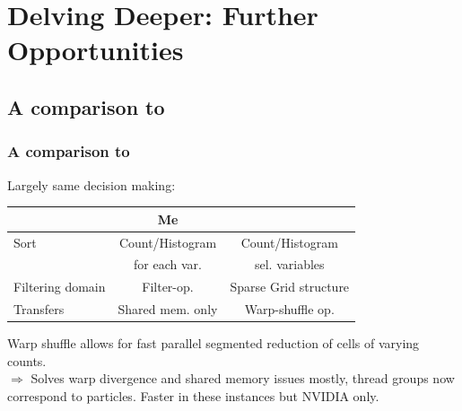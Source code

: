\documentclass{beamer}
\let\oldcite=\cite
\renewcommand{\cite}[1]{\textcolor[rgb]{.55,.55,.89}{\oldcite{#1}}}
\begin{document}
\section{Delving Deeper: Further Opportunities}
\subsection{A comparison to \cite{Gao:2018}}
\begin{frame}
  \frametitle{A comparison to \cite{Gao:2018}}

Largely same decision making:\\
\begin{table}
  \begin{tabular}{|l|c|c|}
    \hline
           & Me              & \cite{Gao:2018} \\\hline
    Sort   & Count/Histogram & Count/Histogram \\
	   & for each var.   & sel. variables  \\\hline
    Filtering domain& Filter-op.& Sparse Grid structure \\\hline
    Transfers        & Shared mem. only & Warp-shuffle op.\\\hline
  \end{tabular}
\end{table}
Warp shuffle allows for fast parallel segmented reduction of cells of varying counts.\\
$\Rightarrow$ Solves warp divergence and shared memory issues mostly, thread groups now correspond to particles. Faster in these instances but NVIDIA only.

\end{frame}

\printbibliography
\end{document}

